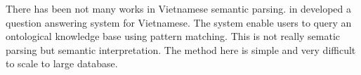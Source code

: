 There has been not many works in Vietnamese semantic parsing. \citeauthor{Nguyen:2009:VQA:1681518.1683170} in \cite{Nguyen:2009:VQA:1681518.1683170} developed a question answering system for Vietnamese. The system enable users to query an ontological knowledge base using pattern matching. This is not really sematic parsing but semantic interpretation. The method here is simple and very difficult to scale to large database. 